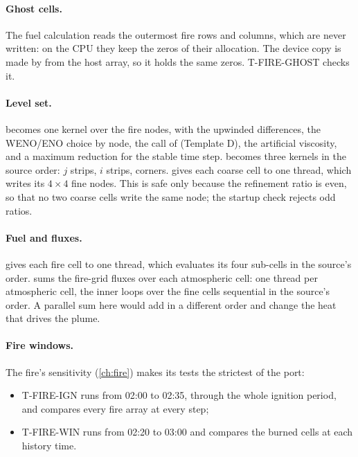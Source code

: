 \paragraph{Ghost cells.} The fuel calculation reads the outermost fire rows and columns, which are never written: on
the CPU they keep the zeros of their allocation. The device copy is made by  from the host
array, so it holds the same zeros. T-FIRE-GHOST checks it.

\paragraph{Level set.}  becomes one kernel over the fire nodes, with the upwinded differences, the
WENO/ENO choice by node, the call of  (Template D), the artificial viscosity, and a maximum reduction for
the stable time step.  becomes three kernels in the source order: $j$ strips, $i$ strips,
corners.  gives each coarse cell to one thread, which writes its $4 \times 4$ fine nodes. This is
safe only because the refinement ratio is even, so that no two coarse cells write the same node; the startup check
rejects odd ratios.

\paragraph{Fuel and fluxes.}  gives each fire cell to one thread, which evaluates its four sub-cells
in the source's order.  sums the fire-grid fluxes over each atmospheric cell: one thread per
atmospheric cell, the inner loops over the fine cells sequential in the source's order. A parallel sum here would add
in a different order and change the heat that drives the plume.

\paragraph{Fire windows.} The fire's sensitivity (\cref{ch:fire}) makes its tests the strictest of the port:
\begin{itemize}
  \item T-FIRE-IGN runs from 02:00 to 02:35, through the whole ignition period, and compares every fire array at every
    step;
  \item T-FIRE-WIN runs from 02:20 to 03:00 and compares the burned cells at each history time.
\end{itemize}

